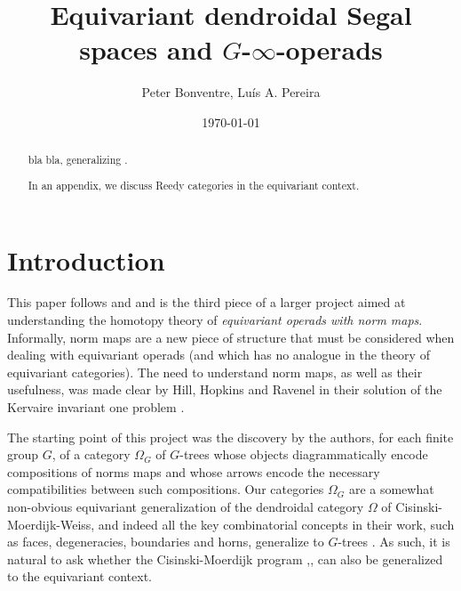 \documentclass[a4paper,10pt,draft]{article}%
\author{Peter Bonventre, Lu\'is A. Pereira}%
\title{Equivariant dendroidal Segal spaces and $G$-$\infty$-operads}%
\date{\today}
\begin{document}
	\maketitle%



\begin{abstract}
      bla bla, generalizing \cite{CM13a}.
      
      In an appendix, we discuss Reedy categories in the equivariant context.
\end{abstract}



\tableofcontents


%
 


\section{Introduction}

This paper follows \cite{Per17} and \cite{BP17} and is the third piece of a larger project aimed at understanding the homotopy theory of 
\textit{equivariant operads with norm maps}.
Informally, norm maps are a new piece of structure that must be considered when dealing with equivariant operads
(and which has no analogue in the theory of equivariant categories).
The need to understand norm maps, as well as their usefulness,
was made clear by Hill, Hopkins and Ravenel in their solution of the Kervaire invariant one problem \cite{HHR16}.

The starting point of this project was the discovery by the authors,
for each finite group $G$,
of a category $\Omega_G$ of $G$-trees whose objects diagrammatically encode compositions of norms maps 
and whose arrows encode the necessary compatibilities between such compositions.
Our categories $\Omega_G$ are a somewhat non-obvious equivariant generalization of the dendroidal category $\Omega$
of Cisinski-Moerdijk-Weiss, 
and indeed all the key combinatorial concepts in their work,
such as faces, degeneracies, boundaries and horns, generalize to $G$-trees \cite[\S 5,6]{Per17}.
As such, it is natural to ask whether the Cisinski-Moerdijk program \cite{CM11},\cite{CM13a},\cite{CM13b} can also be generalized to the equivariant context. 
\end{document}
